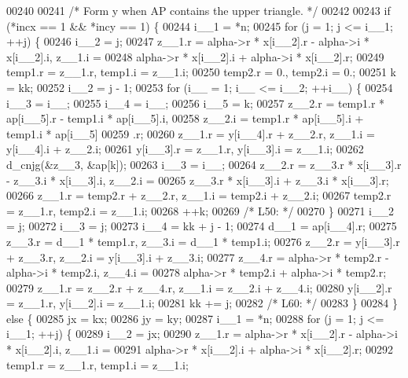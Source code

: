 \begin{DoxyCode}
00240 
00241 \textcolor{comment}{/*        Form  y  when AP contains the upper triangle. */}
00242 
00243     \textcolor{keywordflow}{if} (*incx == 1 && *incy == 1) \{
00244         i\_\_1 = *n;
00245         \textcolor{keywordflow}{for} (j = 1; j <= i\_\_1; ++j) \{
00246         i\_\_2 = j;
00247         z\_\_1.r = alpha->r * x[i\_\_2].r - alpha->i * x[i\_\_2].i, z\_\_1.i =
00248              alpha->r * x[i\_\_2].i + alpha->i * x[i\_\_2].r;
00249         temp1.r = z\_\_1.r, temp1.i = z\_\_1.i;
00250         temp2.r = 0., temp2.i = 0.;
00251         k = kk;
00252         i\_\_2 = j - 1;
00253         \textcolor{keywordflow}{for} (i\_\_ = 1; i\_\_ <= i\_\_2; ++i\_\_) \{
00254             i\_\_3 = i\_\_;
00255             i\_\_4 = i\_\_;
00256             i\_\_5 = k;
00257             z\_\_2.r = temp1.r * ap[i\_\_5].r - temp1.i * ap[i\_\_5].i, 
00258                 z\_\_2.i = temp1.r * ap[i\_\_5].i + temp1.i * ap[i\_\_5]
00259                 .r;
00260             z\_\_1.r = y[i\_\_4].r + z\_\_2.r, z\_\_1.i = y[i\_\_4].i + z\_\_2.i;
00261             y[i\_\_3].r = z\_\_1.r, y[i\_\_3].i = z\_\_1.i;
00262             d\_cnjg(&z\_\_3, &ap[k]);
00263             i\_\_3 = i\_\_;
00264             z\_\_2.r = z\_\_3.r * x[i\_\_3].r - z\_\_3.i * x[i\_\_3].i, z\_\_2.i =
00265                  z\_\_3.r * x[i\_\_3].i + z\_\_3.i * x[i\_\_3].r;
00266             z\_\_1.r = temp2.r + z\_\_2.r, z\_\_1.i = temp2.i + z\_\_2.i;
00267             temp2.r = z\_\_1.r, temp2.i = z\_\_1.i;
00268             ++k;
00269 \textcolor{comment}{/* L50: */}
00270         \}
00271         i\_\_2 = j;
00272         i\_\_3 = j;
00273         i\_\_4 = kk + j - 1;
00274         d\_\_1 = ap[i\_\_4].r;
00275         z\_\_3.r = d\_\_1 * temp1.r, z\_\_3.i = d\_\_1 * temp1.i;
00276         z\_\_2.r = y[i\_\_3].r + z\_\_3.r, z\_\_2.i = y[i\_\_3].i + z\_\_3.i;
00277         z\_\_4.r = alpha->r * temp2.r - alpha->i * temp2.i, z\_\_4.i = 
00278             alpha->r * temp2.i + alpha->i * temp2.r;
00279         z\_\_1.r = z\_\_2.r + z\_\_4.r, z\_\_1.i = z\_\_2.i + z\_\_4.i;
00280         y[i\_\_2].r = z\_\_1.r, y[i\_\_2].i = z\_\_1.i;
00281         kk += j;
00282 \textcolor{comment}{/* L60: */}
00283         \}
00284     \} \textcolor{keywordflow}{else} \{
00285         jx = kx;
00286         jy = ky;
00287         i\_\_1 = *n;
00288         \textcolor{keywordflow}{for} (j = 1; j <= i\_\_1; ++j) \{
00289         i\_\_2 = jx;
00290         z\_\_1.r = alpha->r * x[i\_\_2].r - alpha->i * x[i\_\_2].i, z\_\_1.i =
00291              alpha->r * x[i\_\_2].i + alpha->i * x[i\_\_2].r;
00292         temp1.r = z\_\_1.r, temp1.i = z\_\_1.i;

\end{DoxyCode}

